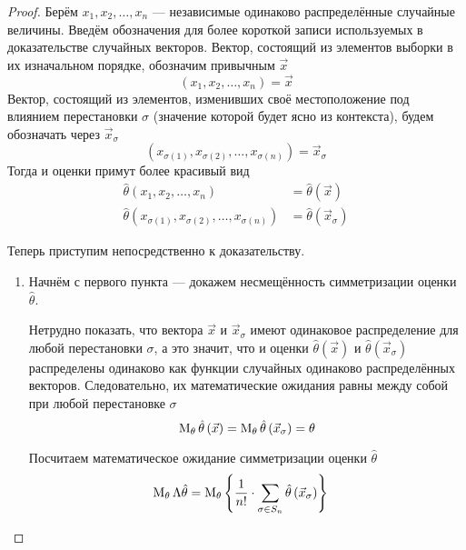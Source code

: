 \begin{proof}
  Берём $x_1, x_2, \dots, x_n$ --- независимые одинаково распределённые
  случайные величины.
  Введём обозначения для более короткой записи
  используемых в доказательстве случайных векторов.
  Вектор, состоящий из элементов выборки в их изначальном порядке,
  обозначим привычным $\vec{x}$
  \begin{equation*}
    \left(x_1, x_2, \dots, x_n\right) = \vec{x}
  \end{equation*}
  Вектор, состоящий из элементов, изменивших своё местоположение под влиянием
  перестановки $\sigma$ (значение которой будет ясно из контекста),
  будем обозначать через $\vec{x}_\sigma$
  \begin{equation*}
    \left(x_{\sigma\left(1\right)}, x_{\sigma\left(2\right)},
      \dots, x_{\sigma\left(n\right)}\right)=\vec{x}_\sigma
  \end{equation*}
  Тогда и оценки примут более красивый вид
  \begin{align*}
      \hat{\theta}\left(x_1, x_2, \dots, x_n\right)
      &= \hat{\theta}\left(\vec{x}\right)\\
      \hat{\theta}\left(x_{\sigma\left(1\right)},
          x_{\sigma\left(2\right)},
          \dots, x_{\sigma\left(n\right)}\right)
      &= \hat{\theta}\left(\vec{x}_\sigma\right)
  \end{align*}

  Теперь приступим непосредственно к доказательству.
  \begin{enumerate}
      \item
      Начнём с первого пункта --- докажем несмещённость
      симметризации оценки $\hat{\theta}$.

      Нетрудно показать, что  вектора $\vec{x}$ и $\vec{x}_\sigma$
      имеют одинаковое распределение для любой перестановки $\sigma$,
      а это значит, что и оценки $\hat{\theta}\left(\vec{x}\right)$
      и $\hat{\theta}\left(\vec{x}_\sigma\right)$
      распределены одинаково как функции случайных
      одинаково распределённых векторов.
      Следовательно, их математические ожидания равны между собой
      при любой перестановке $\sigma$
      $$\operatorname{M}_{\theta} \hat{\theta}\left(\vec{x}\right)
          =\operatorname{M}_{\theta} \hat{\theta}\left(\vec{x}_\sigma\right)
          =\theta$$

      Посчитаем математическое ожидание симметризации оценки
      $\hat{\theta}$
      \begin{align*}
          \operatorname{M}_{\theta} \Lambda\hat{\theta}
        &=\operatorname{M}_{\theta} 
            \left\{\frac{1}{n!}\cdot\sum_{\sigma\in S_n}
            \hat{\theta}\left(\vec{x}_\sigma\right)\right\}
      \end{align*}


\end{enumerate}
\end{proof}
